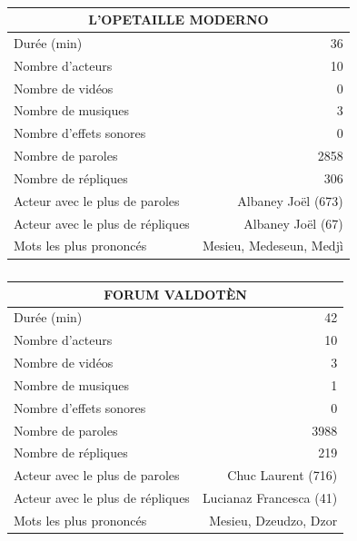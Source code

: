 \newpage
    \begin{table}[]
    \centering
    \caption{}
    \begin{tabular}{lr}\toprule\multicolumn{2}{c}{L’OPETAILLE MODERNO} \\\midrule
\multicolumn{1}{l}{Durée (min)}&36\\
\multicolumn{1}{l}{Nombre d'acteurs}&10\\
\multicolumn{1}{l}{Nombre de vidéos}&0\\
\multicolumn{1}{l}{Nombre de musiques}&3\\
\multicolumn{1}{l}{Nombre d'effets sonores}&0\\
\multicolumn{1}{l}{Nombre de paroles}&2858\\
\multicolumn{1}{l}{Nombre de répliques}&306\\
\multicolumn{1}{l}{Acteur avec le plus de paroles}&Albaney Joël (673)\\
\multicolumn{1}{l}{Acteur avec le plus de répliques}&Albaney Joël (67)\\
\multicolumn{1}{l}{Mots les plus prononcés}&Mesieu, Medeseun, Medjì\\
    \bottomrule
    \end{tabular}%
    \end{table}
    \begin{table}[]
    \centering
    \caption{}
    \begin{tabular}{lr}\toprule\multicolumn{2}{c}{FORUM VALDOTÈN} \\\midrule
\multicolumn{1}{l}{Durée (min)}&42\\
\multicolumn{1}{l}{Nombre d'acteurs}&10\\
\multicolumn{1}{l}{Nombre de vidéos}&3\\
\multicolumn{1}{l}{Nombre de musiques}&1\\
\multicolumn{1}{l}{Nombre d'effets sonores}&0\\
\multicolumn{1}{l}{Nombre de paroles}&3988\\
\multicolumn{1}{l}{Nombre de répliques}&219\\
\multicolumn{1}{l}{Acteur avec le plus de paroles}&Chuc Laurent (716)\\
\multicolumn{1}{l}{Acteur avec le plus de répliques}&Lucianaz Francesca (41)\\
\multicolumn{1}{l}{Mots les plus prononcés}&Mesieu, Dzeudzo, Dzor\\
    \bottomrule
    \end{tabular}%
    \end{table}
